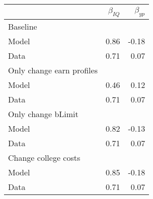 \begin{tabular}{lrr}
\hline
  & $\beta_{IQ}$  & $\beta_{yp}$  \\
\hline
Baseline &   &   \\
Model & 0.86  & -0.18  \\
Data & 0.71  & 0.07  \\
Only change earn profiles &   &   \\
Model & 0.46  & 0.12  \\
Data & 0.71  & 0.07  \\
Only change bLimit &   &   \\
Model & 0.82  & -0.13  \\
Data & 0.71  & 0.07  \\
Change college costs &   &   \\
Model & 0.85  & -0.18  \\
Data & 0.71  & 0.07  \\
\hline
\end{tabular}%
